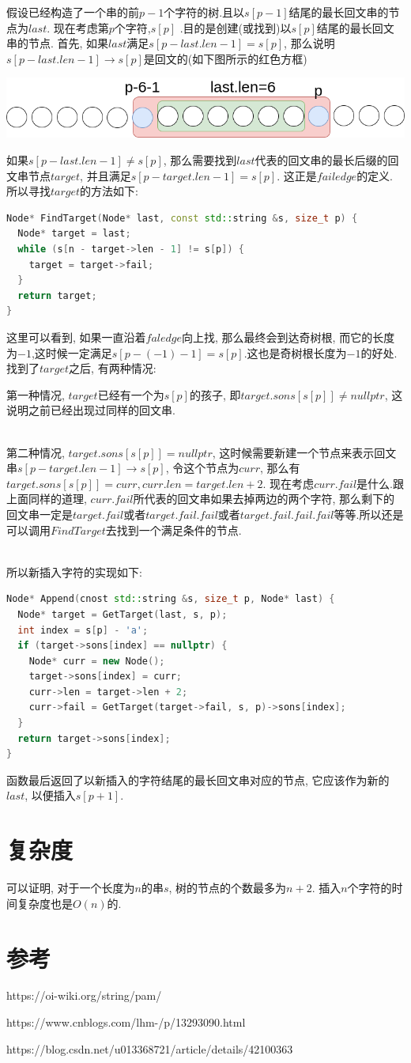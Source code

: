 \documentclass{article}
\begin{document}
假设已经构造了一个串的前$p-1$个字符的树.且以$s[p-1]$结尾的最长回文串的节点为$last$. 现在考虑第$p$个字符,$s[p]$ .目的是创建(或找到)以$s[p]$结尾的最长回文串的节点. 首先, 如果$last$满足$s[p-last.len-1]=s[p]$, 那么说明$s[p-last.len-1]\rightarrow  s[p]$是回文的(如下图所示的红色方框) \par
\includegraphics[scale=0.6]{pic5.png} \par
如果$s[p-last.len-1]\neq s[p]$, 那么需要找到$last$代表的回文串的最长后缀的回文串节点$target$, 并且满足$s[p-target.len-1]=s[p]$. 这正是$failedge$的定义. 所以寻找$target$的方法如下:
\begin{lstlisting}[language=C++, caption={FindTarget}]
Node* FindTarget(Node* last, const std::string &s, size_t p) {
  Node* target = last;
  while (s[n - target->len - 1] != s[p]) {
    target = target->fail;
  }
  return target;
}
\end{lstlisting}
这里可以看到, 如果一直沿着$faledge$向上找, 那么最终会到达奇树根, 而它的长度为$-1$,这时候一定满足$s[p-(-1)-1]=s[p]$.这也是奇树根长度为$-1$的好处.
找到了$target$之后, 有两种情况: \par
第一种情况, $target$已经有一个为$s[p]$的孩子, 即$target.sons[s[p]]\neq nullptr$, 这说明之前已经出现过同样的回文串. \par
~\\
第二种情况, $target.sons[s[p]]= nullptr$, 这时候需要新建一个节点来表示回文串$s[p-target.len-1]\rightarrow  s[p]$, 令这个节点为$curr$, 那么有$target.sons[s[p]]=curr, curr.len=target.len + 2$. 现在考虑$curr.fail$是什么.跟上面同样的道理, $curr.fail$所代表的回文串如果去掉两边的两个字符, 那么剩下的回文串一定是$target.fail$或者$target.fail.fail$或者$target.fail.fail.fail$等等.所以还是可以调用$FindTarget$去找到一个满足条件的节点. \par
~\\
所以新插入字符的实现如下:
\begin{lstlisting}[language=C++, caption={Append}]
Node* Append(cnost std::string &s, size_t p, Node* last) {
  Node* target = GetTarget(last, s, p);
  int index = s[p] - 'a'; 
  if (target->sons[index] == nullptr) {
    Node* curr = new Node();
    target->sons[index] = curr;
    curr->len = target->len + 2;
    curr->fail = GetTarget(target->fail, s, p)->sons[index];
  }
  return target->sons[index];
}
\end{lstlisting}
函数最后返回了以新插入的字符结尾的最长回文串对应的节点, 它应该作为新的$last$, 以便插入$s[p+1]$.

\section{复杂度}
可以证明, 对于一个长度为$n$的串$s$, 树的节点的个数最多为$n+2$. 插入$n$个字符的时间复杂度也是$O(n)$的.

\section{参考}
https://oi-wiki.org/string/pam/ \par
https://www.cnblogs.com/lhm-/p/13293090.html \par
https://blog.csdn.net/u013368721/article/details/42100363 \par
\end{document}
